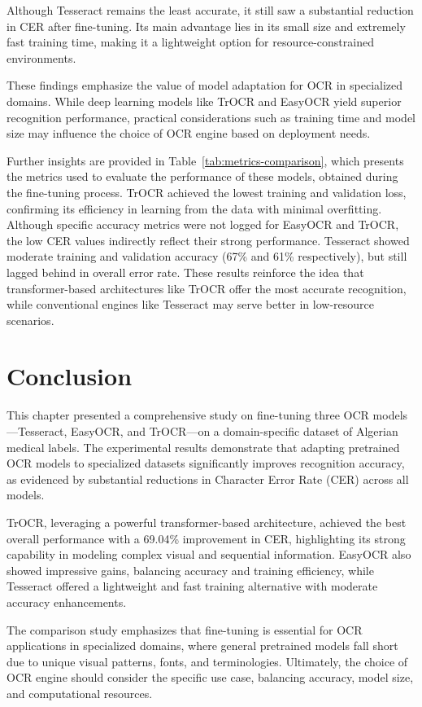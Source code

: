 Although Tesseract remains the least accurate, it still saw a substantial reduction in CER after fine-tuning. Its main advantage lies in its small size and extremely fast training time, making it a lightweight option for resource-constrained environments.

These findings emphasize the value of model adaptation for OCR in specialized domains. While deep learning models like TrOCR and EasyOCR yield superior recognition performance, practical considerations such as training time and model size may influence the choice of OCR engine based on deployment needs.

Further insights are provided in Table~\ref{tab:metrics-comparison}, which presents the metrics used to evaluate the performance of these models, obtained during the fine-tuning process. TrOCR achieved the lowest training and validation loss, confirming its efficiency in learning from the data with minimal overfitting. Although specific accuracy metrics were not logged for EasyOCR and TrOCR, the low CER values indirectly reflect their strong performance. Tesseract showed moderate training and validation accuracy (67\% and 61\% respectively), but still lagged behind in overall error rate. These results reinforce the idea that transformer-based architectures like TrOCR offer the most accurate recognition, while conventional engines like Tesseract may serve better in low-resource scenarios.


\section{Conclusion}

This chapter presented a comprehensive study on fine-tuning three OCR models—Tesseract, EasyOCR, and TrOCR—on a domain-specific dataset of Algerian medical labels. The experimental results demonstrate that adapting pretrained OCR models to specialized datasets significantly improves recognition accuracy, as evidenced by substantial reductions in Character Error Rate (CER) across all models.

TrOCR, leveraging a powerful transformer-based architecture, achieved the best overall performance with a 69.04\% improvement in CER, highlighting its strong capability in modeling complex visual and sequential information. EasyOCR also showed impressive gains, balancing accuracy and training efficiency, while Tesseract offered a lightweight and fast training alternative with moderate accuracy enhancements.

The comparison study emphasizes that fine-tuning is essential for OCR applications in specialized domains, where general pretrained models fall short due to unique visual patterns, fonts, and terminologies. Ultimately, the choice of OCR engine should consider the specific use case, balancing accuracy, model size, and computational resources.
\clearpage
